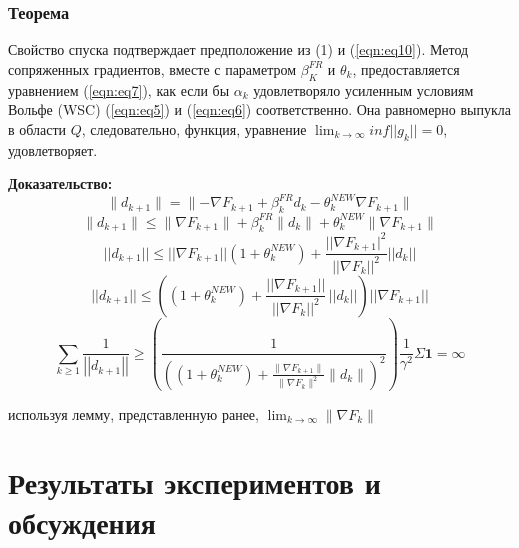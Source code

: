 \subsubsection{Теорема}

Свойство спуска подтверждает предположение из (1) и (\ref{eqn:eq10}). Метод сопряженных
градиентов, вместе с параметром $\beta_{K}^{FR}$ и $\theta_{k}$, предоставляется
уравнением (\ref{eqn:eq7}), как если бы $\alpha_{k}$ удовлетворяло усиленным условиям Вольфе
(WSC) (\ref{eqn:eq5}) и (\ref{eqn:eq6}) соответственно. Она равномерно выпукла в области $Q$,
следовательно, функция, уравнение 
$\lim_{k \rightarrow \infty} inf||g_{k}|| = 0$, удовлетворяет.

\noindent \textbf{Доказательство:}
\begin{equation*}
    \lVert d_{k+1} \rVert = \lVert -\nabla F_{k+1}+\beta_{k}^{F R}d_{k}-\theta_{k}^{N E W} \nabla F_{k+1} \rVert
\end{equation*}
\begin{equation*}
    \|d_{k+1}\|\leq\|\nabla F_{k+1}\|+\beta_{k}^{F R}\|d_{k}\|+\theta_{k}^{N E W}\|\nabla F_{k+1}\|
\end{equation*}
\begin{equation*}
    ||d_{k+1}||\leq||\nabla F_{k+1}||(1+\theta_{k}^{N E W})+\frac{||\nabla F_{k+1}|^{2}}{||\nabla F_{k}||^{2}}||d_{k}||
\end{equation*}
\begin{equation*}
    ||d_{k+1}||\leq\left(\left(1+\theta_{k}^{N E W}\right)+\frac{||\nabla F_{k+1}||}{||\nabla F_{k}||^{2}}\,||d_{k}||\right)||\nabla F_{k+1}||
\end{equation*}
\begin{equation*}
    \sum_{k \geq 1}{\frac{1}{\left|\left|d_{k+1}\right|\right|}} \geq \left( 
        \frac{1}{
            \left(
                \left(1 + \theta_{k}^{N E W}\right) + 
                \frac{\lVert \nabla F_{k+1} \rVert}{\lVert \nabla F_{k} \rVert^{2}}\lVert d_{k} \rVert
            \right)^{2}
        }
    \right) \frac{1}{\gamma^{2}}\Sigma\mathbf{1} = \infty
\end{equation*}

\noindent используя лемму, представленную ранее, 
$\lim_{k \rightarrow \infty} \lVert \nabla F_{k} \rVert$

\section{Результаты экспериментов и обсуждения}

